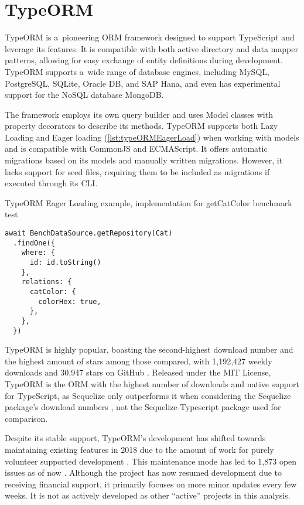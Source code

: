 \section{TypeORM}

TypeORM is a~pioneering ORM framework designed to support TypeScript and
leverage its features. It is compatible with both active directory and data
mapper patterns, allowing for easy exchange of entity definitions during
development. TypeORM supports a~wide range of database engines, including MySQL,
PostgreSQL, SQLite, Oracle DB, and SAP Hana, and even has experimental support
for the NoSQL database MongoDB.

The framework employs its own query builder and uses Model classes with property
decorators to describe its methods. TypeORM supports both Lazy Loading and Eager
loading (\autoref{lst:typeORMEagerLoad}) when working with models and is compatible
with CommonJS and ECMAScript. It offers automatic migrations based on its models
and manually written migrations. However, it lacks support for seed files,
requiring them to be included as migrations if executed through its CLI.

\begin{listing}[hb]
  \caption{TypeORM Eager Loading example, implementation for getCatColor benchmark test}
  \label{lst:typeORMEagerLoad}
  \vspace{-0.5\baselineskip}
  \begin{verbatim}
await BenchDataSource.getRepository(Cat)
  .findOne({
    where: { 
      id: id.toString() 
    },
    relations: {
      catColor: {
        colorHex: true,
      },
    },
  })
  \end{verbatim}
  \vspace{-0.5\baselineskip}
\end{listing}

TypeORM is highly popular, boasting the second-highest download number and the
highest amount of stars among those compared, with 1,192,427 weekly downloads
\cite{typeORMNpm} and 30,947 stars on GitHub \cite{typeORMGitHub}. Released
under the MIT License, TypeORM is the ORM with the highest number of downloads
and native support for TypeScript, as Sequelize only outperforms it when
considering the Sequelize package's download numbers
\cite{sequelizeNpm}, not the Sequelize-Typescript package
\cite{sequelizeTypescriptNpm} used for comparison.

Despite its stable support, TypeORM's development has shifted towards
maintaining existing features in 2018 due to the amount of work for purely
volunteer supported development \cite{typeORMGitHubFuture}. This maintenance
mode has led to 1,873 open issues as of now \cite{typeORMGitHub}. Although the
project has now resumed development due to receiving financial support, it
primarily focuses on more minor updates every few weeks. It is not as actively
developed as other \enquote{active} projects in this analysis.

